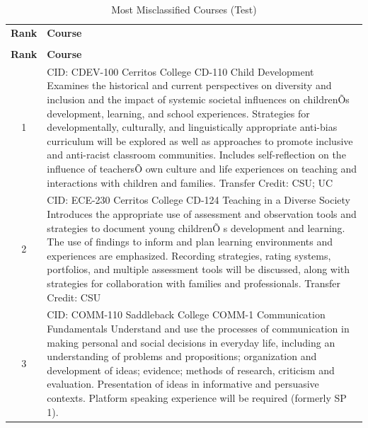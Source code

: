 {
\renewcommand{\arraystretch}{0.5}    
\begin{longtable}{ >{\baselineskip=12pt}c >{\baselineskip=12pt}p{} }
\captionsetup{skip=5pt}
\caption{Most Misclassified Courses (Test)}\label{tab:fp_overlap_test}\\
\toprule
\textbf{\textbf{Rank}} & \textbf{\textbf{Course}} \\
\midrule
\endfirsthead
\caption[]{Most Misclassified Courses (Test)}\\
\toprule
\textbf{\textbf{Rank}} & \textbf{\textbf{Course}} \\
\midrule
\endhead
1 & CID: CDEV-100 \newline
Cerritos College \newline
CD-110 Child Development \newline
Examines the historical and current perspectives on diversity and inclusion and the impact of systemic societal influences on childrenÕs development, learning, and school experiences. Strategies for developmentally, culturally, and linguistically appropriate anti-bias curriculum will be explored as well as approaches to promote inclusive and anti-racist classroom communities. Includes self-reflection on the influence of teachersÕ own culture and life experiences on teaching and interactions with children and families.
Transfer Credit: CSU; UC\\
\midrule
2 & CID: ECE-230 \newline
Cerritos College \newline
CD-124 Teaching in a Diverse Society \newline
Introduces the appropriate use of assessment and observation tools and strategies to document young childrenÕ
s development and learning. The use of findings to inform and plan learning environments and experiences are
emphasized. Recording strategies, rating systems, portfolios, and multiple assessment tools will be
discussed, along with strategies for collaboration with families and professionals. 
Transfer Credit: CSU\\
\midrule
3 & CID: COMM-110 \newline
Saddleback College \newline
COMM-1 Communication Fundamentals \newline
Understand and use the processes of communication in making personal and social decisions in everyday life, including an understanding of problems and propositions; organization and development of ideas; evidence; methods of research, criticism and evaluation. Presentation of ideas in informative and persuasive contexts. Platform speaking experience will be required (formerly SP 1).\\

\end{longtable}}
